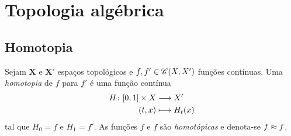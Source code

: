 \section{Topologia algébrica}

\subsection{Homotopia}

\begin{definition}
Sejam $\bm X$ e $\bm X'$ espaços topológicos e $f,f' \in \mathscr{C}(X,X')$ funções contínuas. Uma \textit{homotopia} de $f$ para $f'$ é uma função contínua
	\begin{align*}
	{H}\colon {\left[{0},{1}\right] \times X} &\longrightarrow {X'} \\{(t,x)} &\longmapsto H_t(x)
	\end{align*}
tal que $H_0 = f$ e $H_1 = f'$. As funções $f$ e $f$ são \textit{homotópicas} e denota-se $f \approx f$.
\end{definition}

